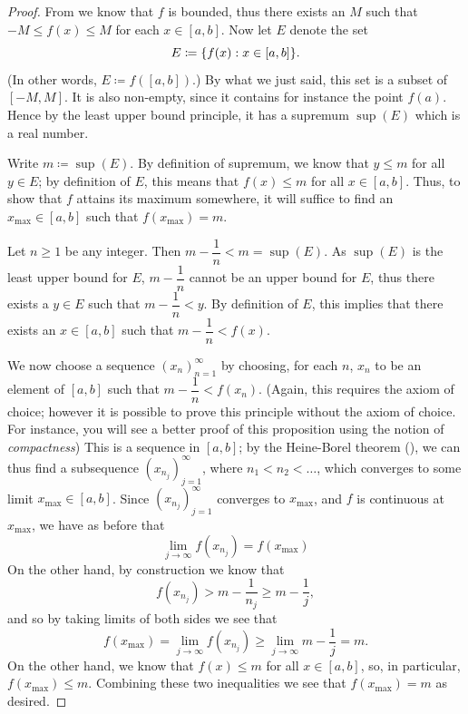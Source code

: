 \begin{proof}
  From  we know that \(f\) is bounded, thus there exists an \(M\) such that \(-M \leq f(x) \leq M\) for each \(x \in [a, b]\).
  Now let \(E\) denote the
  set
  \[
    E \coloneqq \set{f(x) : x \in [a, b]}.
  \]
  (In other words, \(E \coloneqq f([a, b])\).)
  By what we just said, this set is a subset of \([-M, M]\).
  It is also non-empty, since it contains for instance the point \(f(a)\).
  Hence by the least upper bound principle, it has a supremum \(\sup(E)\) which is a real number.

  Write \(m \coloneqq \sup(E)\).
  By definition of supremum, we know that \(y \leq m\) for all \(y \in E\);
  by definition of \(E\), this means that \(f(x) \leq m\) for all \(x \in [a, b]\).
  Thus, to show that \(f\) attains its maximum somewhere, it will suffice to find an \(x_{\max} \in [a, b]\) such that \(f(x_{\max}) = m\).

  Let \(n \geq 1\) be any integer.
  Then \(m - \dfrac{1}{n} < m = \sup(E)\).
  As \(\sup(E)\) is the least upper bound for \(E\), \(m - \dfrac{1}{n}\) cannot be an upper bound for \(E\), thus there exists a \(y \in E\) such that \(m - \dfrac{1}{n} < y\).
  By definition of \(E\), this implies that there exists an \(x \in [a, b]\) such that \(m - \dfrac{1}{n} < f(x)\).

  We now choose a sequence \((x_n)_{n = 1}^\infty\) by choosing, for each \(n\), \(x_n\) to be an element of \([a, b]\) such that \(m - \dfrac{1}{n} < f(x_n)\).
  (Again, this requires the axiom of choice;
  however it is possible to prove this principle without the axiom of choice.
  For instance, you will see a better proof of this proposition using the notion of \emph{compactness})
  This is a sequence in \([a, b]\);
  by the Heine-Borel theorem (), we can thus find a subsequence \((x_{n_j})_{j = 1}^\infty\), where \(n_1 < n_2 < \dots\), which converges to some limit \(x_{\max} \in [a, b]\).
  Since \((x_{n_j})_{j = 1}^\infty\) converges to \(x_{\max}\), and \(f\) is continuous at \(x_{\max}\), we have as before that
  \[
    \lim_{j \to \infty} f(x_{n_j}) = f(x_{\max})
  \]
  On the other hand, by construction we know that
  \[
    f(x_{n_j}) > m - \dfrac{1}{n_j} \geq m - \dfrac{1}{j},
  \]
  and so by taking limits of both sides we see that
  \[
    f(x_{\max}) = \lim_{j \to \infty} f(x_{n_j}) \geq \lim_{j \to \infty} m - \dfrac{1}{j} = m.
  \]
  On the other hand, we know that \(f(x) \leq m\) for all \(x \in [a, b]\), so, in particular, \(f(x_{\max}) \leq m\).
  Combining these two inequalities we see that \(f(x_{\max}) = m\) as desired.


\end{proof}
